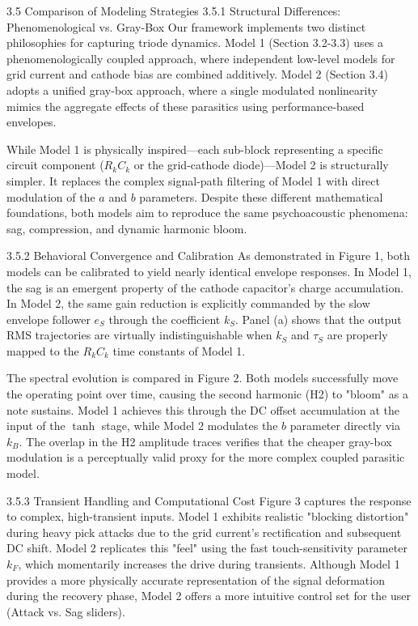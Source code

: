 3.5 Comparison of Modeling Strategies
3.5.1 Structural Differences: Phenomenological vs. Gray-Box
Our framework implements two distinct philosophies for capturing triode dynamics. Model 1 (Section 3.2-3.3) uses a phenomenologically coupled approach, where independent low-level models for grid current and cathode bias are combined additively. Model 2 (Section 3.4) adopts a unified gray-box approach, where a single modulated nonlinearity mimics the aggregate effects of these parasitics using performance-based envelopes.

While Model 1 is physically inspired—each sub-block representing a specific circuit component ($R_k C_k$ or the grid-cathode diode)—Model 2 is structurally simpler. It replaces the complex signal-path filtering of Model 1 with direct modulation of the $a$ and $b$ parameters. Despite these different mathematical foundations, both models aim to reproduce the same psychoacoustic phenomena: sag, compression, and dynamic harmonic bloom.

3.5.2 Behavioral Convergence and Calibration
As demonstrated in Figure 1, both models can be calibrated to yield nearly identical envelope responses. In Model 1, the sag is an emergent property of the cathode capacitor's charge accumulation. In Model 2, the same gain reduction is explicitly commanded by the slow envelope follower $e_S$ through the coefficient $k_S$. Panel (a) shows that the output RMS trajectories are virtually indistinguishable when $k_S$ and $\tau_S$ are properly mapped to the $R_k C_k$ time constants of Model 1.

The spectral evolution is compared in Figure 2. Both models successfully move the operating point over time, causing the second harmonic (H2) to "bloom" as a note sustains. Model 1 achieves this through the DC offset accumulation at the input of the $\tanh$ stage, while Model 2 modulates the $b$ parameter directly via $k_B$. The overlap in the H2 amplitude traces verifies that the cheaper gray-box modulation is a perceptually valid proxy for the more complex coupled parasitic model.

3.5.3 Transient Handling and Computational Cost
Figure 3 captures the response to complex, high-transient inputs. Model 1 exhibits realistic "blocking distortion" during heavy pick attacks due to the grid current's rectification and subsequent DC shift. Model 2 replicates this "feel" using the fast touch-sensitivity parameter $k_F$, which momentarily increases the drive during transients. Although Model 1 provides a more physically accurate representation of the signal deformation during the recovery phase, Model 2 offers a more intuitive control set for the user (Attack vs. Sag sliders).

